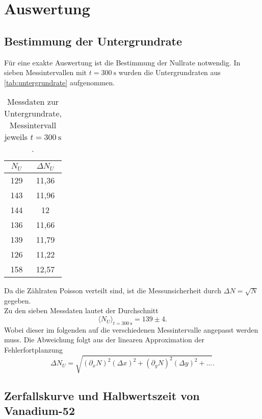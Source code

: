 \section{Auswertung}
\label{sec:Auswertung}

\subsection{Bestimmung der Untergrundrate}
\label{sec:aus:untergrundrate}

Für eine exakte Auswertung ist die Bestimmung der Nullrate notwendig.
In sieben Messintervallen mit $t = \SI{300}{\second}$ wurden die 
Untergrundraten aus \autoref{tab:untergrundrate} aufgenommen.
\begin{table}
	\centering
	\caption{Messdaten zur Untergrundrate, Messintervall jeweils $t = \SI{300}{\second}$.}
	\label{tab:untergrundrate}
	\begin{tabular}{c c}
		\toprule
		$N_U$ & $\Delta N_U$ \\
		\midrule
		129 & 11,36 \\
		143 & 11,96 \\
		144 & 12 \\
		136 & 11,66 \\
		139 & 11,79 \\
		126 & 11,22 \\
		158 & 12,57 \\
		\bottomrule
	\end{tabular}
\end{table}

\noindent
Da die Zählraten Poisson verteilt sind, ist die Messunsicherheit durch $\Delta N = \sqrt{N}$ 
gegeben.
\\
Zu den sieben Messdaten lautet der Durchschnitt
\begin{equation}
	\langle N_U \rangle_{t = \SI{300}{\second}} = 139 \pm 4.
\end{equation}
Wobei dieser im folgenden auf die verschiedenen Messintervalle angepasst werden muss.
\noindent
Die Abweichung folgt aus der linearen Approximation der Fehlerfortplanzung
\begin{equation}
	\Delta N_U = \sqrt{(\partial_x N)^2 (\Delta x)^2 + (\partial_y N)^2 (\Delta y)^2 + \hdots}.
	\label{eqn:fehlerfortpflanzung}
\end{equation}

\subsection{Zerfallskurve und Halbwertszeit von Vanadium-52}
\label{sec:aus:vanadium}


